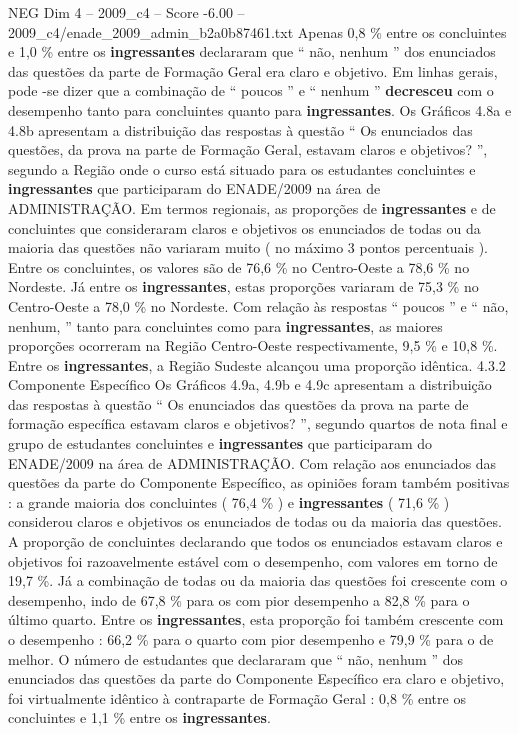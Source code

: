 \begin{textsample}{NEG Dim 4 – 2009\_c4 – Score -6.00 – 2009\_c4/enade\_2009\_admin\_b2a0b87461.txt}
Apenas 0,8 \% entre os concluintes e 1,0 \% entre os \textbf{ingressantes} declararam que “ não, nenhum ” dos enunciados das questões da parte de Formação Geral era claro e objetivo.
Em linhas gerais, pode -se dizer que a combinação de “ poucos ” e “ nenhum ” \textbf{decresceu} com o desempenho tanto para concluintes quanto para \textbf{ingressantes}.
Os Gráficos 4.8a e 4.8b apresentam a distribuição das respostas à questão “ Os enunciados das questões, da prova na parte de Formação Geral, estavam claros e objetivos? ”, segundo a Região onde o curso está situado para os estudantes concluintes e \textbf{ingressantes} que participaram do ENADE/2009 na área de ADMINISTRAÇÃO.
Em termos regionais, as proporções de \textbf{ingressantes} e de concluintes que consideraram claros e objetivos os enunciados de todas ou da maioria das questões não variaram muito ( no máximo 3 pontos percentuais ).
Entre os concluintes, os valores são de 76,6 \% no Centro-Oeste a 78,6 \% no Nordeste.
Já entre os \textbf{ingressantes}, estas proporções variaram de 75,3 \% no Centro-Oeste a 78,0 \% no Nordeste.
Com relação às respostas “ poucos ” e “ não, nenhum, ” tanto para concluintes como para \textbf{ingressantes}, as maiores proporções ocorreram na Região Centro-Oeste respectivamente, 9,5 \% e 10,8 \%.
Entre os \textbf{ingressantes}, a Região Sudeste alcançou uma proporção idêntica. 4.3.2 Componente Específico Os Gráficos 4.9a, 4.9b e 4.9c apresentam a distribuição das respostas à questão “ Os enunciados das questões da prova na parte de formação específica estavam claros e objetivos? ”, segundo quartos de nota final e grupo de estudantes concluintes e \textbf{ingressantes} que participaram do ENADE/2009 na área de ADMINISTRAÇÃO.
Com relação aos enunciados das questões da parte do Componente Específico, as opiniões foram também positivas : a grande maioria dos concluintes ( 76,4 \% ) e \textbf{ingressantes} ( 71,6 \% ) considerou claros e objetivos os enunciados de todas ou da maioria das questões.
A proporção de concluintes declarando que todos os enunciados estavam claros e objetivos foi razoavelmente estável com o desempenho, com valores em torno de 19,7 \%.
Já a combinação de todas ou da maioria das questões foi crescente com o desempenho, indo de 67,8 \% para os com pior desempenho a 82,8 \% para o último quarto.
Entre os \textbf{ingressantes}, esta proporção foi também crescente com o desempenho : 66,2 \% para o quarto com pior desempenho e 79,9 \% para o de melhor.
O número de estudantes que declararam que “ não, nenhum ” dos enunciados das questões da parte do Componente Específico era claro e objetivo, foi virtualmente idêntico à contraparte de Formação Geral : 0,8 \% entre os concluintes e 1,1 \% entre os \textbf{ingressantes}.

\end{textsample}
